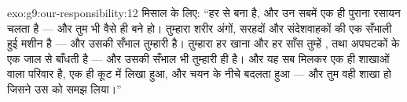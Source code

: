 \begin{solution}{exo:g9:our-responsibility:12}
मिसाल के लिए: ``हर   से बना है, और उन सबमें एक ही पुराना
रसायन चलता है --- और तुम भी वैसे ही बने हो। तुम्हारा शरीर अंगों, सरहदों
और संदेशवाहकों की एक सँभाली हुई मशीन है --- और उसकी सँभाल तुम्हारी है।
तुम्हारा हर खाना और हर साँस तुम्हें ,  तथा अपघटकों के
एक जाल से बाँधती है --- और उसकी सँभाल भी तुम्हारी ही है। और यह सब मिलकर
एक ही शाखाओं वाला परिवार है, एक ही कूट में लिखा हुआ, और चयन के नीचे
बदलता हुआ --- और तुम वही शाखा हो जिसने उस  को समझ लिया।''
\end{solution}

